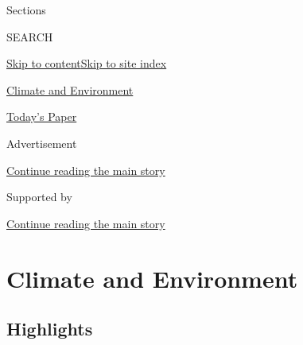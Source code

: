 Sections

SEARCH

\protect\hyperlink{site-content}{Skip to
content}\protect\hyperlink{site-index}{Skip to site index}

\href{https://www.nytimes3xbfgragh.onion/section/climate}{Climate and
Environment}

\href{https://myaccount.nytimes3xbfgragh.onion/auth/login?response_type=cookie\&client_id=vi}{}

\href{https://www.nytimes3xbfgragh.onion/section/todayspaper}{Today's
Paper}

Advertisement

\protect\hyperlink{after-top}{Continue reading the main story}

Supported by

\protect\hyperlink{after-sponsor}{Continue reading the main story}

\hypertarget{climate-and-environment}{%
\section{Climate and Environment}\label{climate-and-environment}}

\hypertarget{highlights}{%
\subsection{Highlights}\label{highlights}}

